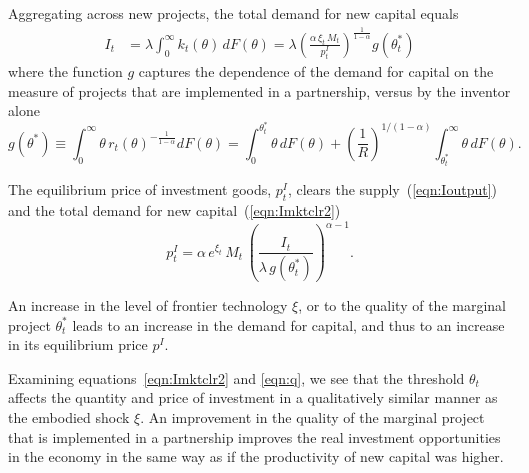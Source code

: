 \documentclass[12pt]{article}
\begin{document}
Aggregating across new projects, the total demand for new capital equals
\begin{align}
I_t&=\lambda \int_0^{\infty} k_t (\theta) \,d F(\theta)=  \lambda  \left(\frac{ \alpha\, \xi_t\, M_t}{p^I_t}\right)^{\frac{1}{1-\alpha}}  g(\theta_t^*) \label{eqn:Imktclr2}
\end{align}
where the function $g$ captures the dependence of the demand for capital on the measure of projects that are implemented in a partnership, versus by the inventor alone
\begin{equation}
g(\theta^*) \equiv \int_0^\infty \theta \, r_t(\theta)^{-\frac{1}{1-\alpha}}   d F(\theta)  =      \int_0^{\theta^*_t} \theta \, d F(\theta) +  \left(\frac{1}{R}\right)^{1/(1-\alpha)}\int_{\theta^*_t}^\infty \theta\,  d F(\theta) .
\end{equation}

The equilibrium price of investment goods, $p^I_t$,  clears the supply~(\ref{eqn:Ioutput}) and the total demand for new capital~(\ref{eqn:Imktclr2})
\begin{equation}\label{eqn:q}
p^I_t =  \alpha \,e^{\xi_t}  \, M_t \,  \left(\frac{I_t}{ \lambda \,g(\theta_t^*)}\right)^{\alpha-1}.
\end{equation}

An increase in the level of frontier technology $\xi$, or to the quality of the marginal project $\theta_t^*$  leads to an increase in the demand for capital, and thus to an increase in its equilibrium price $p^I$. %

Examining equations~\eqref{eqn:Imktclr2} and \eqref{eqn:q}, we see that the threshold $\theta_t$ affects the quantity and price of investment in a qualitatively similar manner as the embodied shock $\xi$. An improvement in the quality of the marginal project that is implemented in a partnership improves the real investment opportunities in the economy in the same way as if the productivity of new capital was higher.
\end{document}
